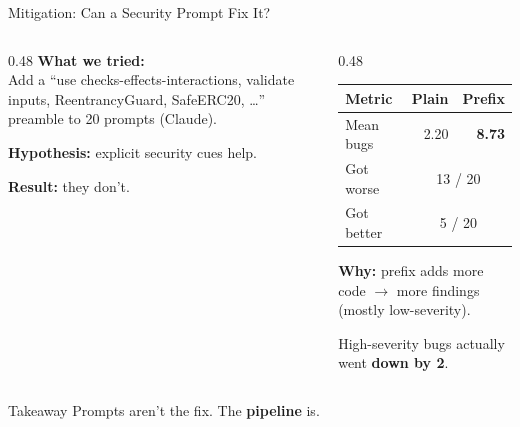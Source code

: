 \documentclass[aspectratio=169]{beamer}
\begin{document}
\begin{frame}{Mitigation: Can a Security Prompt Fix It?}
\begin{columns}
\begin{column}{0.48\textwidth}
\textbf{What we tried:}\\
Add a ``use checks-effects-interactions, validate inputs, ReentrancyGuard, SafeERC20, \ldots'' preamble to 20 prompts (Claude).

\vspace{0.3cm}
\textbf{Hypothesis:} explicit security cues help.

\vspace{0.3cm}
\textbf{Result:} they don't.
\end{column}
\begin{column}{0.48\textwidth}
\begin{center}
\small
\begin{tabular}{@{}lrr@{}}
\toprule
\textbf{Metric} & \textbf{Plain} & \textbf{Prefix} \\
\midrule
Mean bugs & 2.20 & \textbf{8.73} \\
Got worse & \multicolumn{2}{c}{13 / 20} \\
Got better & \multicolumn{2}{c}{5 / 20} \\
\bottomrule
\end{tabular}
\end{center}

\vspace{0.3cm}
\textbf{Why:} prefix adds more code $\to$ more findings (mostly low-severity).

High-severity bugs actually went \textbf{down by 2}.
\end{column}
\end{columns}

\vspace{0.15cm}
\begin{block}{Takeaway}
\centering Prompts aren't the fix. The \textbf{pipeline} is.
\end{block}
\end{frame}
\end{document}
